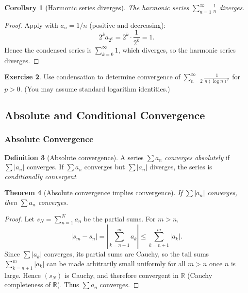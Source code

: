 \documentclass[12pt]{article}
\numberwithin{equation}{section}
\def\abs#1{|#1|}
\newcommand{\RR}{\mathbb{R}}
\DeclarePairedDelimiter{\abs}{\lvert}{\rvert}
\theoremstyle{plain}
\newtheorem{theorem}{Theorem}[section]
\newtheorem{corollary}[theorem]{Corollary}
\theoremstyle{definition}
\newtheorem{definition}[theorem]{Definition}
\newtheorem{exercise}[theorem]{Exercise}
\theoremstyle{remark}
\begin{document}
\begin{corollary}[Harmonic series diverges]\label{cor:harmonic-div}
The harmonic series $\sum_{n=1}^{\infty}\frac{1}{n}$ diverges.
\end{corollary}

\begin{proof}
Apply  with $a_n=1/n$ (positive and decreasing):
\[
2^k a_{2^k} = 2^k\cdot \frac{1}{2^k}=1.
\]
Hence the condensed series is $\sum_{k=0}^{\infty}1$, which diverges, so the harmonic series diverges.
\end{proof}

\begin{exercise}
Use condensation to determine convergence of $\sum_{n=2}^{\infty} \frac{1}{n(\log n)^p}$ for $p>0$.
(You may assume standard logarithm identities.)
\end{exercise}

\newpage

\subsection{Absolute and Conditional Convergence}

\subsubsection{Absolute Convergence}

\begin{definition}[Absolute convergence]
A series $\sum a_n$ \emph{converges absolutely} if $\sum \abs{a_n}$ converges.
If $\sum a_n$ converges but $\sum \abs{a_n}$ diverges, the series is \emph{conditionally convergent}.
\end{definition}

\begin{theorem}[Absolute convergence implies convergence]\label{thm:abs-implies}
If $\sum \abs{a_n}$ converges, then $\sum a_n$ converges.
\end{theorem}

\begin{proof}
Let $s_N=\sum_{n=1}^{N}a_n$ be the partial sums.
For $m>n$,
\[
\abs{s_m-s_n}
=
\abs{\sum_{k=n+1}^{m}a_k}
\le
\sum_{k=n+1}^{m}\abs{a_k}.
\]
Since $\sum \abs{a_k}$ converges, its partial sums are Cauchy, so the tail sums $\sum_{k=n+1}^{m}\abs{a_k}$ can be made arbitrarily small uniformly for all $m>n$ once $n$ is large.
Hence $(s_N)$ is Cauchy, and therefore convergent in $\RR$ (Cauchy completeness of $\RR$).
Thus $\sum a_n$ converges.
\end{proof}
\end{document}
